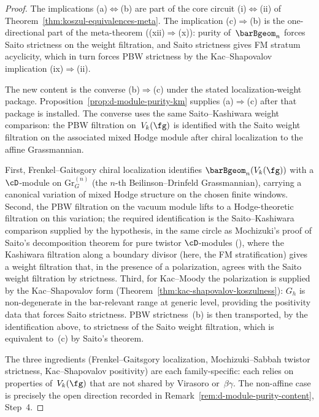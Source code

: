 \begin{proof}
The implications \textup{(a)}$\Leftrightarrow$\textup{(b)}
are part of the core circuit
\textup{(i)}$\Leftrightarrow$\textup{(ii)} of
Theorem~\ref{thm:koszul-equivalences-meta}.
The implication \textup{(c)}$\Rightarrow$\textup{(b)}
is the one-directional part of the meta-theorem
(\textup{(xii)}$\Rightarrow$\textup{(x)}): purity
of~$\barBgeom_n$ forces Saito strictness on the weight
filtration, and Saito strictness gives FM stratum
acyclicity, which in turn forces PBW strictness by the
Kac--Shapovalov implication
\textup{(ix)}$\Rightarrow$\textup{(ii)}.

The new content is the converse \textup{(b)}$\Rightarrow$\textup{(c)}
under the stated localization-weight package. Proposition~\ref{prop:d-module-purity-km}
supplies \textup{(a)}$\Rightarrow$\textup{(c)} after that package is
installed. The converse uses the same Saito--Kashiwara weight
comparison: the PBW filtration on~$V_k(\fg)$ is identified with the
Saito weight filtration on the associated mixed Hodge module after
chiral localization to the affine Grassmannian.

First, Frenkel--Gaitsgory chiral localization identifies
$\barBgeom_n(V_k(\fg))$ with a $\cD$-module on
$\mathrm{Gr}_G^{(n)}$ (the $n$-th Beilinson--Drinfeld
Grassmannian), carrying a canonical variation of mixed
Hodge structure on the chosen finite windows.
Second, the PBW filtration on the vacuum module lifts to
a Hodge-theoretic filtration on this variation; the required
identification is the Saito--Kashiwara comparison supplied by the
hypothesis, in the same circle as Mochizuki's proof of Saito's
decomposition theorem for pure twistor $\cD$-modules
\textup{(}\cite{Mochizuki2015,Sabbah2014}\textup{)},
where the Kashiwara filtration along a boundary divisor
(here, the FM stratification) gives a weight filtration
that, in the presence of a polarization, agrees with the
Saito weight filtration by strictness.
Third, for Kac--Moody the polarization is supplied by the
Kac--Shapovalov form
\textup{(}Theorem~\textup{\ref{thm:kac-shapovalov-koszulness}}\textup{):}
$G_h$ is non-degenerate in the bar-relevant range at
generic level, providing the positivity data that forces
Saito strictness. PBW strictness~\textup{(b)} is then
transported, by the identification above, to strictness
of the Saito weight filtration, which is equivalent
to~\textup{(c)} by Saito's theorem.

The three ingredients (Frenkel--Gaitsgory localization,
Mochizuki--Sabbah twistor strictness, Kac--Shapovalov
positivity) are each family-specific: each relies on
properties of~$V_k(\fg)$ that are not shared by Virasoro
or~$\beta\gamma$. The non-affine case is precisely the
open direction recorded in
Remark~\ref{rem:d-module-purity-content}, Step~4.
\end{proof}

